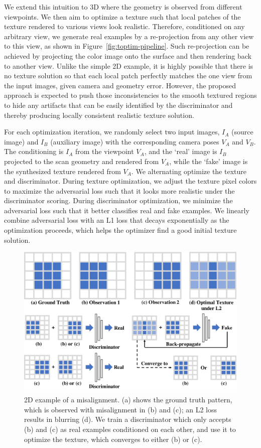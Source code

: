 %
We extend this intuition to 3D where the geometry is observed from different viewpoints.
%
We then aim to optimize a texture such that local patches of the texture rendered to various views look realistic.
%
Therefore, conditioned on any arbitrary view, we generate real examples by a re-projection from any other view to this view, as shown in Figure~\ref{fig:toptim-pipeline}.
%
Such re-projection can be achieved by projecting the color image onto the surface and then rendering back to another view.
%
Unlike the simple 2D example, it is highly possible that there is no texture solution so that each local patch perfectly matches the one view from the input images, given camera and geometry error.
%
However, the proposed approach is expected to push those inconsistencies to the smooth textured regions to hide any artifacts that can be easily identified by the discriminator and thereby producing locally consistent realistic texture solution.
%

%
For each optimization iteration, we randomly select two input images, $I_A$ (source image) and $I_B$ (auxiliary image) with the corresponding camera poses $V_A$ and $V_B$.
%
The conditioning is $I_A$ from the viewpoint $V_A$, and the `real' image is $I_B$ projected to the scan geometry and rendered from $V_A$, while the `fake' image is the synthesized texture rendered from $V_A$.
%
We alternating optimize the texture and discriminator.
%
During texture optimization, we adjust the texture pixel colors to maximize the adversarial loss such that it looks more realistic under the discriminator scoring.
%
During discriminator optimization, we minimize the adversarial loss such that it better classifies real and fake examples.
%
We linearly combine adversarial loss with an L1 loss that decays exponentially as the optimization proceeds, which helps the optimizer find a good initial texture solution.
%


\begin{figure}
    \centering
    \includegraphics[width=0.75\linewidth]{texturegen/figures/intuitive.pdf}
    \caption{2D example of a misalignment. (a) shows the ground truth pattern, which is observed with misalignment in (b) and (c); an L2 loss results in blurring (d). 
    We train a discriminator which only accepts (b) and (c) as real examples conditioned on each other, and use it to optimize the texture, which converges to either (b) or (c).}
    \label{fig:toptim-misalign-example}
\end{figure}


